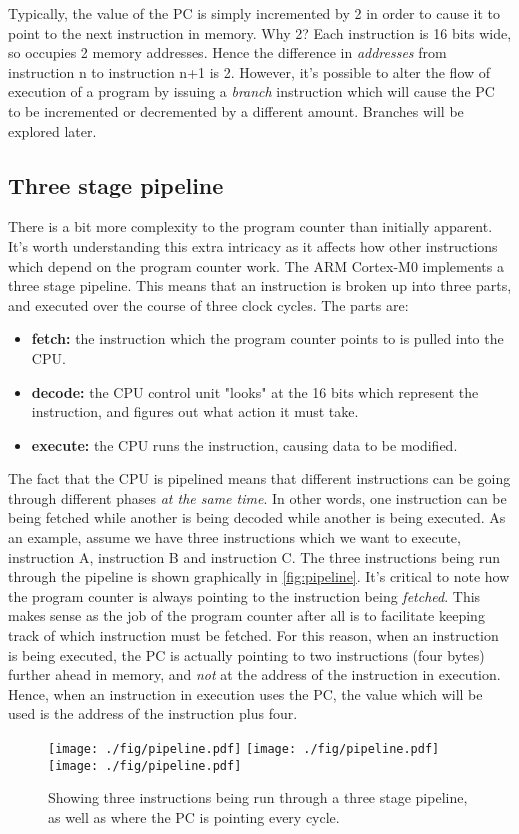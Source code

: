 Typically, the value of the PC is simply incremented by 2 in order to cause it to point to the next instruction in memory. Why 2? Each instruction is 16 bits wide, so occupies 2 memory addresses. Hence the difference in \emph{addresses} from instruction n to instruction n+1 is 2. However, it's possible to alter the flow of execution of a program by issuing a \emph{branch} instruction which will cause the PC to be incremented or decremented by a different amount. Branches will be explored later.

\subsection{Three stage pipeline}
There is a bit more complexity to the program counter than initially apparent. It's worth understanding this extra intricacy as it affects how other instructions which depend on the program counter work. 
The ARM Cortex-M0 implements a three stage pipeline. This means that an instruction is broken up into three parts, and executed over the course of three clock cycles. The parts are:
\begin{itemize}
  \item \textbf{fetch:} the instruction which the program counter points to is pulled into the CPU.
  \item \textbf{decode:} the CPU control unit "looks" at the 16 bits which represent the instruction, and figures out what action it must take.
  \item \textbf{execute:} the CPU runs the instruction, causing data to be modified.
\end{itemize}
The fact that the CPU is pipelined means that different instructions can be going through different phases \emph{at the same time}. In other words, one instruction can be being fetched while another is being decoded while another is being executed. 
As an example, assume we have three instructions which we want to execute, instruction A, instruction B and instruction C. The three instructions being run through the pipeline is shown graphically in \autoref{fig:pipeline}. It's critical to note how the program counter is always pointing to the instruction being \emph{fetched}. This makes sense as the job of the program counter after all is to facilitate keeping track of which instruction must be fetched. For this reason, when an instruction is being executed, the PC is actually pointing to two instructions (four bytes) further ahead in memory, and \emph{not} at the address of the instruction in execution. Hence, when an instruction in execution uses the PC, the value which will be used is the address of the instruction plus four.
\begin{figure}
  \centering
  \texttt{[image: ./fig/pipeline.pdf]}
  \texttt{[image: ./fig/pipeline.pdf]}
  \texttt{[image: ./fig/pipeline.pdf]}
\caption{Showing three instructions being run through a three stage pipeline, as well as where the PC is pointing every cycle.}
\label{fig:pipeline}
\end{figure}

